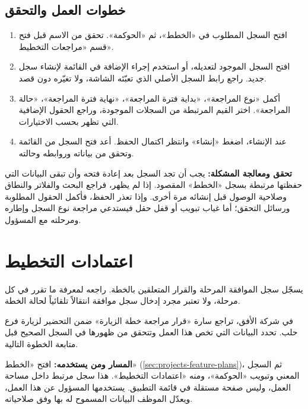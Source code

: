 \subsection{خطوات العمل والتحقق}
\begin{enumerate}
\item افتح السجل المطلوب في «الخطط»، ثم «الحوكمة». تحقق من الاسم قبل فتح قسم «مراجعات التخطيط».
\item افتح السجل الموجود لتعديله، أو استخدم إجراء الإضافة في القائمة لإنشاء سجل جديد. راجع رابط السجل الأصلي الذي تعبّئه الشاشة، ولا تغيّره دون قصد.
\item أكمل «نوع المراجعة»، «بداية فترة المراجعة»، «نهاية فترة المراجعة»، «حالة المراجعة». اختر القيم المرتبطة من السجلات الموجودة، وراجع الحقول الإضافية التي تظهر بحسب الاختيارات.
\item عند الإنشاء، اضغط «إنشاء» وانتظر اكتمال الحفظ. أعد فتح السجل من القائمة وتحقق من بياناته وروابطه وحالته.
\end{enumerate}

\textbf{تحقق ومعالجة المشكلة:} يجب أن تجد السجل بعد إعادة فتحه وأن تبقى البيانات التي حفظتها مرتبطة بسجل «الخطط» المقصود. إذا لم يظهر، فراجع البحث والفلاتر والنطاق وصلاحية الوصول قبل إنشائه مرة أخرى. وإذا تعذر الحفظ، فأكمل الحقول المطلوبة ورسائل التحقق؛ أما غياب تبويب أو قفل حقل فيستدعي مراجعة نوع السجل وإطاره ومرحلته مع المسؤول.

\clearpage
\section{اعتمادات التخطيط}
\label{sec:projects-feature-planning-approvals}

يسجّل سجل الموافقة المرحلة والقرار المتعلقين بالخطة. راجعه لمعرفة ما تقرر في كل مرحلة، ولا تعتبر مجرد إدخال سجل موافقة انتقالاً تلقائياً لحالة الخطة.

\begin{rcnote}
في شركة الأفق، تراجع سارة «قرار مراجعة خطة الزيارة» ضمن التحضير لزيارة فرع حلب. تحدد البيانات التي تخص هذا العمل وتتحقق من ظهورها في السجل الصحيح قبل متابعة الخطوة التالية.
\end{rcnote}

\textbf{المسار ومن يستخدمه:} افتح «الخطط» (\ref{sec:projects-feature-plans})، ثم السجل المعني وتبويب «الحوكمة»، ومنه «اعتمادات التخطيط». هذا سجل مرتبط داخل مساحة العمل، وليس صفحة مستقلة في قائمة التطبيق. يستخدمها المسؤول عن هذا العمل، ويعدّل الموظف البيانات المسموح له بها وفق صلاحياته.

